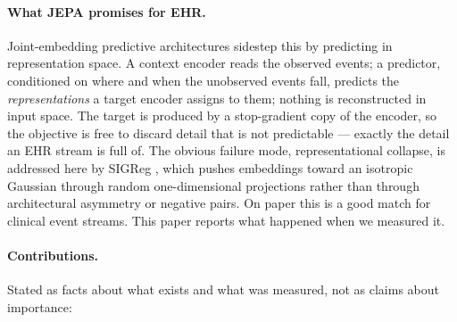 \documentclass[11pt,a4paper]{article}
\begin{document}
\paragraph{What JEPA promises for EHR.}
Joint-embedding predictive architectures \citep{ijepa,vjepa2} sidestep this by
predicting in representation space. A context encoder reads the observed
events; a predictor, conditioned on where and when the unobserved events fall,
predicts the \emph{representations} a target encoder assigns to them; nothing is
reconstructed in input space. The target is produced by a stop-gradient copy of
the encoder, so the objective is free to discard detail that is not predictable
--- exactly the detail an EHR stream is full of. The obvious failure mode,
representational collapse, is addressed here by SIGReg \citep{lejepa}, which
pushes embeddings toward an isotropic Gaussian through random one-dimensional
projections rather than through architectural asymmetry or negative pairs. On
paper this is a good match for clinical event streams. This paper reports what
happened when we measured it.

\paragraph{Contributions.}
Stated as facts about what exists and what was measured, not as claims about
importance:
\end{document}
